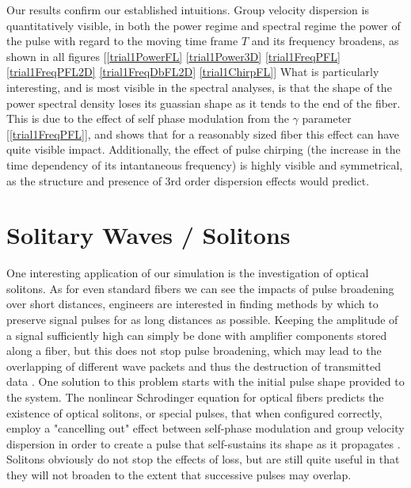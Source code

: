 \documentclass[10pt, a4paper, twocolumn]{article} %
\begin{document}
Our results confirm our established intuitions. Group velocity dispersion is quantitatively visible, in both the power regime and spectral regime the power of the pulse with regard to the moving time frame $T$ and its frequency broadens, as shown in all figures [\ref{trial1PowerFL} \ref{trial1Power3D} \ref{trial1FreqPFL} \ref{trial1FreqPFL2D} \ref{trial1FreqDbFL2D} \ref{trial1ChirpFL}]
What is particularly interesting, and is most visible in the spectral analyses, is that the shape of the power spectral density loses its guassian shape as it tends to the end of the fiber. This is due to the effect of self phase modulation from the $\gamma$ parameter [\ref{trial1FreqPFL}], and shows that for a reasonably sized fiber this effect can have quite visible impact. Additionally, the effect of pulse chirping (the increase in the time dependency of its intantaneous frequency) is highly visible and symmetrical, as the structure and presence of 3rd order dispersion effects would predict.

\section{Solitary Waves / Solitons}
One interesting application of our simulation is the investigation of optical solitons. As for even standard fibers we can see the impacts of pulse broadening over short distances, engineers are interested in finding methods by which to preserve signal pulses for as long distances as possible. Keeping the amplitude of a signal sufficiently high can simply be done with amplifier components stored along a fiber, but this does not stop pulse broadening, which may lead to the overlapping of different wave packets and thus the destruction of transmitted data \cite{AgrawalChap3}. One solution to this problem starts with the initial pulse shape provided to the system. The nonlinear Schrodinger equation for optical fibers predicts the existence of optical solitons, or special pulses, that when configured correctly, employ a "cancelling out" effect between self-phase modulation and group velocity dispersion in order to create a pulse that self-sustains its shape as it propagates \cite{AgrawalChap5}. Solitons obviously do not stop the effects of loss, but are still quite useful in that they will not broaden to the extent that successive pulses may overlap. 
\end{document}
